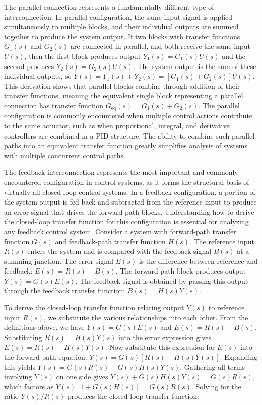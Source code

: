 The parallel connection represents a fundamentally different type of interconnection. In parallel configuration, the same input signal is applied simultaneously to multiple blocks, and their individual outputs are summed together to produce the system output. If two blocks with transfer functions $G_1(s)$ and $G_2(s)$ are connected in parallel, and both receive the same input $U(s)$, then the first block produces output $Y_1(s) = G_1(s)U(s)$ and the second produces $Y_2(s) = G_2(s)U(s)$. The system output is the sum of these individual outputs, so $Y(s) = Y_1(s) + Y_2(s) = \left[G_1(s) + G_2(s)\right]U(s)$. This derivation shows that parallel blocks combine through addition of their transfer functions, meaning the equivalent single block representing a parallel connection has transfer function $G_{\text{eq}}(s) = G_1(s) + G_2(s)$. The parallel configuration is commonly encountered when multiple control actions contribute to the same actuator, such as when proportional, integral, and derivative controllers are combined in a PID structure. The ability to combine such parallel paths into an equivalent transfer function greatly simplifies analysis of systems with multiple concurrent control paths.

The feedback interconnection represents the most important and commonly encountered configuration in control systems, as it forms the structural basis of virtually all closed-loop control systems. In a feedback configuration, a portion of the system output is fed back and subtracted from the reference input to produce an error signal that drives the forward-path blocks. Understanding how to derive the closed-loop transfer function for this configuration is essential for analyzing any feedback control system. Consider a system with forward-path transfer function $G(s)$ and feedback-path transfer function $H(s)$. The reference input $R(s)$ enters the system and is compared with the feedback signal $B(s)$ at a summing junction. The error signal $E(s)$ is the difference between reference and feedback: $E(s) = R(s) - B(s)$. The forward-path block produces output $Y(s) = G(s)E(s)$. The feedback signal is obtained by passing this output through the feedback transfer function: $B(s) = H(s)Y(s)$.

To derive the closed-loop transfer function relating output $Y(s)$ to reference input $R(s)$, we substitute the various relationships into each other. From the definitions above, we have $Y(s) = G(s)E(s)$ and $E(s) = R(s) - B(s)$. Substituting $B(s) = H(s)Y(s)$ into the error expression gives $E(s) = R(s) - H(s)Y(s)$. Now substitute this expression for $E(s)$ into the forward-path equation: $Y(s) = G(s)\left[R(s) - H(s)Y(s)\right]$. Expanding this yields $Y(s) = G(s)R(s) - G(s)H(s)Y(s)$. Gathering all terms involving $Y(s)$ on one side gives $Y(s) + G(s)H(s)Y(s) = G(s)R(s)$, which factors as $Y(s)\left[1 + G(s)H(s)\right] = G(s)R(s)$. Solving for the ratio $Y(s)/R(s)$ produces the closed-loop transfer function:

